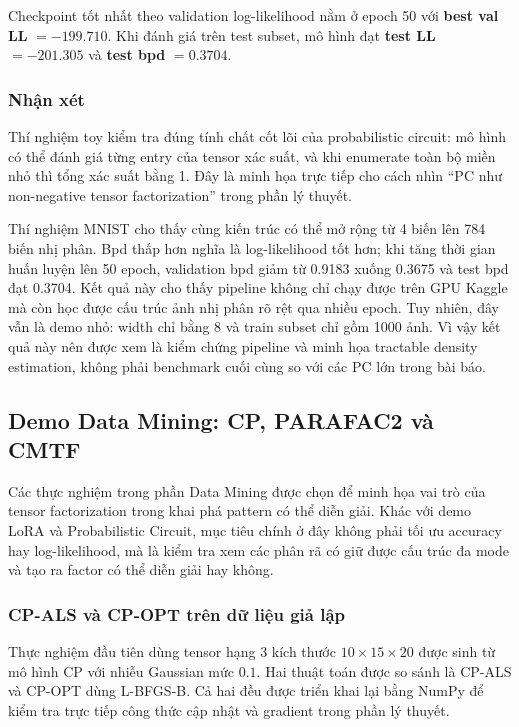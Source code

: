 Checkpoint tốt nhất theo validation log-likelihood nằm ở epoch 50 với
\textbf{best val LL} $=-199.710$. Khi đánh giá trên test subset, mô hình đạt
\textbf{test LL} $=-201.305$ và \textbf{test bpd} $=0.3704$.

\subsubsection{Nhận xét}

Thí nghiệm toy kiểm tra đúng tính chất cốt lõi của probabilistic circuit: mô hình
có thể đánh giá từng entry của tensor xác suất, và khi enumerate toàn bộ miền nhỏ
thì tổng xác suất bằng 1. Đây là minh họa trực tiếp cho cách nhìn ``PC như
non-negative tensor factorization'' trong phần lý thuyết.

Thí nghiệm MNIST cho thấy cùng kiến trúc có thể mở rộng từ 4 biến lên 784 biến
nhị phân. Bpd thấp hơn nghĩa là log-likelihood tốt hơn; khi tăng thời gian huấn
luyện lên 50 epoch, validation bpd giảm từ 0.9183 xuống 0.3675 và test bpd đạt
0.3704. Kết quả này cho thấy pipeline không chỉ chạy được trên GPU Kaggle mà còn
học được cấu trúc ảnh nhị phân rõ rệt qua nhiều epoch. Tuy nhiên, đây vẫn là demo nhỏ: width chỉ bằng 8 và train subset chỉ gồm 1000 ảnh. Vì vậy kết quả này nên được xem là kiểm chứng pipeline và minh họa tractable density estimation, không phải benchmark cuối cùng so với các PC lớn trong bài báo.

\subsection{Demo Data Mining: CP, PARAFAC2 và CMTF}

Các thực nghiệm trong phần Data Mining được chọn để minh họa vai trò của tensor
factorization trong khai phá pattern có thể diễn giải. Khác với demo LoRA và
Probabilistic Circuit, mục tiêu chính ở đây không phải tối ưu accuracy hay
log-likelihood, mà là kiểm tra xem các phân rã có giữ được cấu trúc đa mode và
tạo ra factor có thể diễn giải hay không.

\subsubsection{CP-ALS và CP-OPT trên dữ liệu giả lập}

Thực nghiệm đầu tiên dùng tensor hạng 3 kích thước $10 \times 15 \times 20$
được sinh từ mô hình CP với nhiễu Gaussian mức $0.1$. Hai thuật toán được so
sánh là CP-ALS và CP-OPT dùng L-BFGS-B. Cả hai đều được triển khai lại bằng
NumPy để kiểm tra trực tiếp công thức cập nhật và gradient trong phần lý thuyết.

